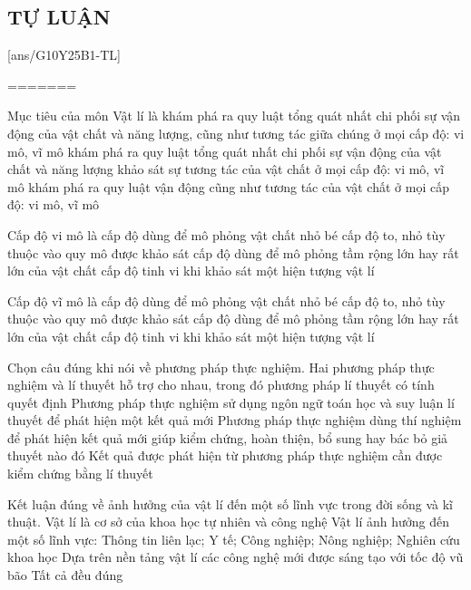 \subsection{TỰ LUẬN}
\setcounter{ex}{0}
[ans/G10Y25B1-TL]

=======

\begin{ex}
	Mục tiêu của môn Vật lí là
	\choice
	{\True khám phá ra quy luật tổng quát nhất chi phối sự vận động của vật chất và năng lượng, cũng như tương tác giữa chúng ở mọi cấp độ: vi mô, vĩ mô}
	{khám phá ra quy luật tổng quát nhất chi phối sự vận động của vật chất và năng lượng}
	{khảo sát sự tương tác của vật chất ở mọi cấp độ: vi mô, vĩ mô}
	{khám phá ra quy luật vận động cũng như tương tác của vật chất ở mọi cấp độ: vi mô, vĩ mô}
	\loigiai{}
\end{ex}

\begin{ex}
	Cấp độ vi mô là
	\choice
	{\True cấp độ dùng để mô phỏng vật chất nhỏ bé}
	{cấp độ to, nhỏ tùy thuộc vào quy mô được khảo sát}
	{cấp độ dùng để mô phỏng tầm rộng lớn hay rất lớn của vật chất}
	{cấp độ tinh vi khi khảo sát một hiện tượng vật lí}
	\loigiai{}
\end{ex}

\begin{ex}
	Cấp độ vĩ mô là
	\choice
	{cấp độ dùng để mô phỏng vật chất nhỏ bé}
	{cấp độ to, nhỏ tùy thuộc vào quy mô được khảo sát}
	{\True cấp độ dùng để mô phỏng tầm rộng lớn hay rất lớn của vật chất}
	{cấp độ tinh vi khi khảo sát một hiện tượng vật lí}
	\loigiai{}
\end{ex}

\begin{ex}
	Chọn câu đúng khi nói về phương pháp thực nghiệm.
	\choice
	{Hai phương pháp thực nghiệm và lí thuyết hỗ trợ cho nhau, trong đó phương pháp lí thuyết có tính quyết định}
	{Phương pháp thực nghiệm sử dụng ngôn ngữ toán học và suy luận lí thuyết để phát hiện một kết quả mới}
	{\True Phương pháp thực nghiệm dùng thí nghiệm để phát hiện kết quả mới giúp kiểm chứng, hoàn thiện, bổ sung hay bác bỏ giả thuyết nào đó}
	{Kết quả được phát hiện từ phương pháp thực nghiệm cần được kiểm chứng bằng lí thuyết}
	\loigiai{}
\end{ex}

\begin{ex}
	Kết luận đúng về ảnh hưởng của vật lí đến một số lĩnh vực trong đời sống và kĩ thuật.
	\choice
	{Vật lí là cơ sở của khoa học tự nhiên và công nghệ}
	{Vật lí ảnh hưởng đến một số lĩnh vực: Thông tin liên lạc; Y tế; Công nghiệp; Nông nghiệp; Nghiên cứu khoa học}
	{Dựa trên nền tảng vật lí các công nghệ mới được sáng tạo với tốc độ vũ bão}
	{\True Tất cả đều đúng}
	\loigiai{}
\end{ex}

